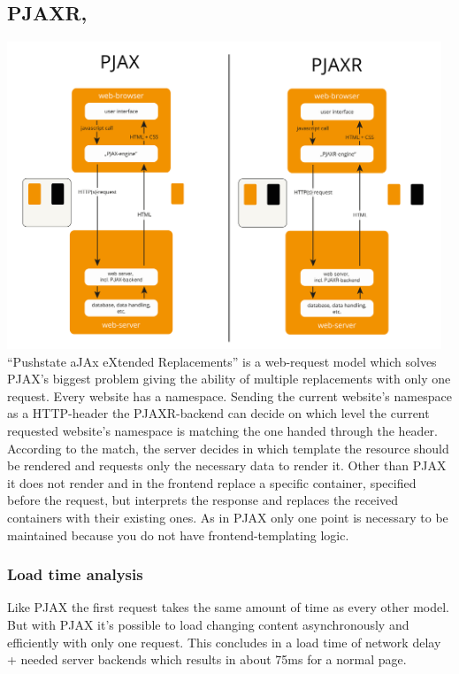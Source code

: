 \documentclass[f,bachelor,binding,twoside,palatino]{WeSTthesis}
\def \pjax {PJAX}
\def \pjaxr {PJAXR}
\begin{document}
  \subsection{\pjaxr{}, \label{pjaxr}}
    \includegraphics[width=13cm]{images/pjax_vs_pjaxr}\\
    \enquote{Pushstate aJAx eXtended Replacements} is a web-request model which solves \pjax{}'s biggest problem giving the ability of multiple replacements with only one request. 
    Every website has a namespace.
    Sending the current website's namespace as a HTTP-header the \pjaxr{}-backend can decide on which level the current requested website's namespace is matching the one handed through the header.
    According to the match, the server decides in which template the resource should be rendered and requests only the necessary data to render it.
    Other than \pjax{} it does not render and in the frontend replace a specific container, specified before the request, but interprets the response and replaces the received containers with their existing ones.
    As in \pjax{} only one point is necessary to be maintained because you do not have frontend-templating logic.

    \subsubsection{Load time analysis}
      Like \pjax{} the first request takes the same amount of time as every other model.
      But with \pjax{} it's possible to load changing content asynchronously and efficiently with only one request.
      This concludes in a load time of network delay + needed server backends which results in about 75ms for a normal page.
    
\end{document}
